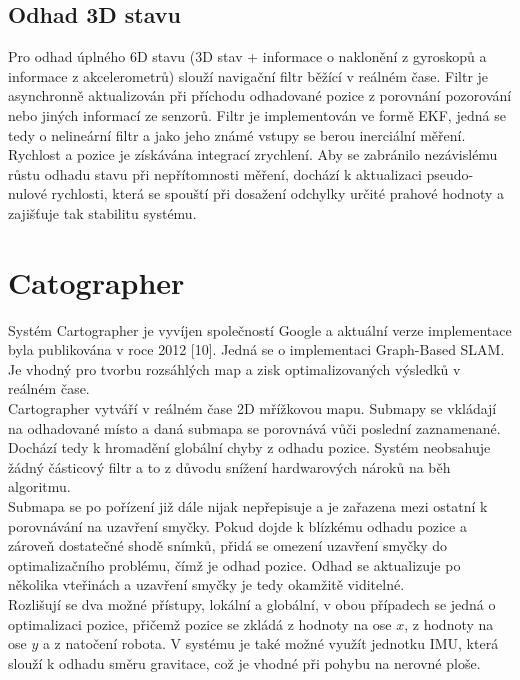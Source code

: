 \documentclass[12pt]{report}
\begin{document}
\subsection{Odhad 3D stavu}
Pro odhad úplného 6D stavu (3D stav + informace o naklonění z gyroskopů a informace z akcelerometrů) slouží navigační filtr běžící v reálném čase. Filtr je asynchronně aktualizován při příchodu odhadované pozice z porovnání pozorování nebo jiných informací ze senzorů. Filtr je implementován ve formě EKF, jedná se tedy o nelineární filtr a jako jeho známé vstupy se berou inerciální měření. Rychlost a pozice je získávána integrací zrychlení. Aby se zabránilo nezávislému růstu odhadu stavu při nepřítomnosti měření, dochází k aktualizaci pseudo-nulové rychlosti, která se spouští při dosažení odchylky určité prahové hodnoty a zajišťuje tak stabilitu systému.\\

\newpage

\section{Catographer}

Systém Cartographer je vyvíjen společností Google a aktuální verze implementace byla publikována v roce 2012 [10]. Jedná se o implementaci Graph-Based SLAM. Je vhodný pro tvorbu rozsáhlých map a zisk optimalizovaných výsledků v reálném čase. \\
\indent Cartographer vytváří v reálném čase 2D mřížkovou mapu. Submapy se vkládají na odhadované místo a daná submapa se porovnává vůči poslední zaznamenané. Dochází tedy k hromadění globální chyby z odhadu pozice. Systém neobsahuje žádný částicový filtr a to z důvodu snížení hardwarových nároků na běh algoritmu.\\
\indent Submapa se po pořízení již dále nijak nepřepisuje a je zařazena mezi ostatní k porovnávání na uzavření smyčky. Pokud dojde k blízkému odhadu pozice a zároveň dostatečné shodě snímků, přidá se omezení uzavření smyčky do optimalizačního problému, čímž je odhad pozice. Odhad se aktualizuje po několika vteřinách a uzavření smyčky je tedy okamžitě viditelné.\\
\indent Rozlišují se dva možné přístupy, lokální a globální, v obou případech se jedná o optimalizaci pozice, přičemž pozice se zkládá z hodnoty na ose $x$, z hodnoty na ose $y$ a z natočení robota. V systému je také možné využít jednotku IMU, která slouží k odhadu směru gravitace, což je vhodné při pohybu na nerovné ploše.\\
\end{document}
